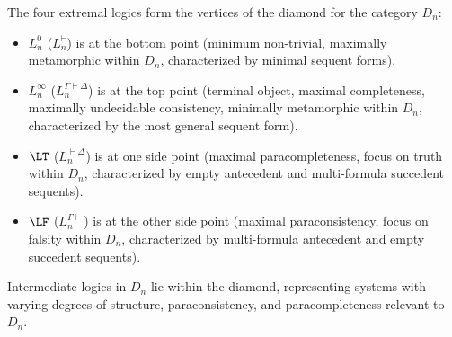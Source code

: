 																																																																											\begin{remark}
																																																																												The four extremal logics form the vertices of the diamond for the category $D_n$:
																																																																												\begin{itemize}
																																																																													\item $L^0_n$ ($L^{\vdash}_n$) is at the bottom point (minimum non-trivial, maximally metamorphic within $D_n$, characterized by minimal sequent forms).
																																																																													\item $L^\infty_n$ ($L^{\Gamma\vdash\Delta}_n$) is at the top point (terminal object, maximal completeness, maximally undecidable consistency, minimally metamorphic within $D_n$, characterized by the most general sequent form).
																																																																													\item $\LT$ ($L^{\vdash\Delta}_n$) is at one side point (maximal paracompleteness, focus on truth within $D_n$, characterized by empty antecedent and multi-formula succedent sequents).
																																																																													\item $\LF$ ($L^{\Gamma\vdash}_n$) is at the other side point (maximal paraconsistency, focus on falsity within $D_n$, characterized by multi-formula antecedent and empty succedent sequents).
																																																																													\end{itemize}
																																																																														Intermediate logics in $D_n$ lie within the diamond, representing systems with varying degrees of structure, paraconsistency, and paracompleteness relevant to $D_n$.
																																																																														

\end{remark}
